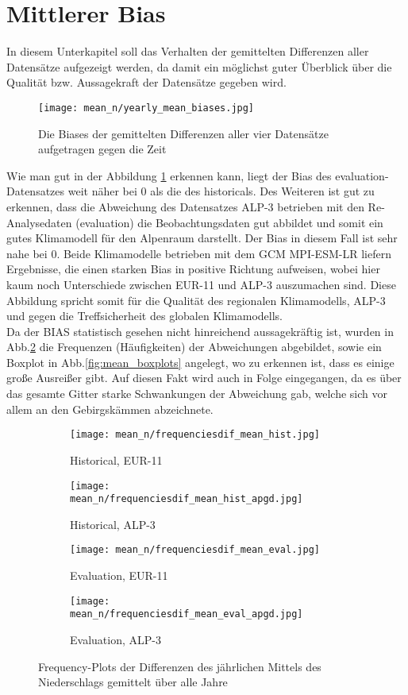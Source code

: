 \section{Mittlerer Bias}
In diesem Unterkapitel soll das Verhalten der gemittelten Differenzen aller Datensätze aufgezeigt werden, da damit ein möglichst guter Überblick über die Qualität bzw. Aussagekraft der Datensätze gegeben wird.
\begin{figure}[h!]
	\texttt{[image: mean\_n/yearly\_mean\_biases.jpg]}
	\caption{Die Biases der gemittelten Differenzen aller vier Datensätze aufgetragen gegen die Zeit}
	\label{fig:yearly_mean_biases}
\end{figure}
Wie man gut in der Abbildung \ref{fig:yearly_mean_biases} erkennen kann, liegt der Bias des evaluation-Datensatzes weit näher bei 0 als die des historicals. Des Weiteren ist gut zu erkennen, dass die Abweichung des Datensatzes ALP-3 betrieben mit den Re-Analysedaten (evaluation) die Beobachtungsdaten gut abbildet und somit ein gutes Klimamodell für den Alpenraum darstellt. Der Bias in diesem Fall ist sehr nahe bei 0. Beide Klimamodelle betrieben mit dem GCM MPI-ESM-LR liefern Ergebnisse, die einen starken Bias in positive Richtung aufweisen, wobei hier kaum noch Unterschiede zwischen EUR-11 und ALP-3 auszumachen sind. Diese Abbildung spricht somit für die Qualität des regionalen Klimamodells, ALP-3 und gegen die Treffsicherheit des globalen Klimamodells.\\
Da der BIAS statistisch gesehen nicht hinreichend aussagekräftig ist, wurden in Abb.\ref{fig:mean_freq_plots} die Frequenzen (Häufigkeiten) der Abweichungen abgebildet, sowie ein Boxplot in Abb.\ref{fig:mean_boxplots} angelegt, wo zu erkennen ist, dass es einige große Ausreißer gibt. Auf diesen Fakt wird auch in Folge eingegangen, da es über das gesamte Gitter starke Schwankungen der Abweichung gab, welche sich vor allem an den Gebirgskämmen abzeichnete.\newpage
\begin{figure}[h!]
	\begin{subfigure}{0.49\textwidth}
		\texttt{[image: mean\_n/frequenciesdif\_mean\_hist.jpg]}
		\caption{Historical, EUR-11}
	\end{subfigure}
	\begin{subfigure}{0.49\textwidth}
		\texttt{[image: mean\_n/frequenciesdif\_mean\_hist\_apgd.jpg]}
		\caption{Historical, ALP-3}
	\end{subfigure}
	\begin{subfigure}{0.49\textwidth}
		\texttt{[image: mean\_n/frequenciesdif\_mean\_eval.jpg]}
		\caption{Evaluation, EUR-11}
	\end{subfigure}
	\begin{subfigure}{0.49\textwidth}
		\texttt{[image: mean\_n/frequenciesdif\_mean\_eval\_apgd.jpg]}
		\caption{Evaluation, ALP-3}
	\end{subfigure}
	\caption{Frequency-Plots der Differenzen des jährlichen Mittels des Niederschlags gemittelt über alle Jahre}
	\label{fig:mean_freq_plots}
\end{figure}
